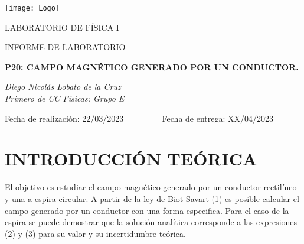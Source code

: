 \documentclass[article, 11pt]{report}
\begin{document}
	
	\begin{titlepage}
		\begin{center}
			\texttt{[image: Logo]}
		\end{center}
		
		\begin{center}
			
			
			{\scshape\Large LABORATORIO DE FÍSICA I \\ \par}
			\vspace{0.5cm}
			\vspace{2.5cm}
			{\scshape\Large INFORME DE LABORATORIO\\ \par}
			\vspace{0.5cm}
			{\Large\bfseries P20: CAMPO MAGNÉTICO GENERADO POR UN CONDUCTOR.
				\par}
			
			
			
			
			
			\vspace{1cm}
			{\itshape Diego Nicolás Lobato de la Cruz \\
				Primero de CC Físicas: Grupo E \par} 
			
			\vspace{0.5cm}
			
			Fecha de realización: 22/03/2023 ~~~~~~~~
			Fecha de entrega: XX/04/2023
			
		\end{center}
		
		\vspace{2cm}
		
		\tableofcontents
	\end{titlepage}
	
	\newpage
	
	
	\section{INTRODUCCIÓN TEÓRICA} \label{1.}
	
	El objetivo es estudiar el campo magnético generado por un conductor rectilíneo y una a espira circular. A partir de la ley de Biot-Savart (1) es posible calcular el campo generado por un conductor con una forma especifica. Para el caso de la espira se puede demostrar que la solución analítica corresponde a las expresiones (2) y (3) para su valor y su incertidumbre teórica.
	
\end{document}
